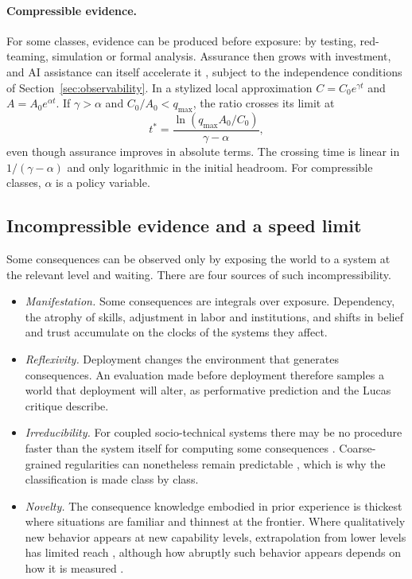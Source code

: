 \documentclass[11pt]{article}
\theoremstyle{plain}
\theoremstyle{definition}
\newcommand{\qmax}{q_{\max}}
\begin{document}
\paragraph{Compressible evidence.} For some classes, evidence can be produced before exposure: by testing, red-teaming, simulation or formal analysis. Assurance then grows with investment, and AI assistance can itself accelerate it \citep{perez2022}, subject to the independence conditions of Section~\ref{sec:observability}. In a stylized local approximation $C=C_0e^{\gamma t}$ and $A=A_0e^{\alpha t}$. If $\gamma>\alpha$ and $C_0/A_0<\qmax$, the ratio crosses its limit at
\begin{equation}\label{eq:crossing}
t^\ast=\frac{\ln(\qmax A_0/C_0)}{\gamma-\alpha},
\end{equation}
even though assurance improves in absolute terms. The crossing time is linear in $1/(\gamma-\alpha)$ and only logarithmic in the initial headroom. For compressible classes, $\alpha$ is a policy variable.

\subsection{Incompressible evidence and a speed limit}

Some consequences can be observed only by exposing the world to a system at the relevant level and waiting. There are four sources of such incompressibility.
\begin{itemize}[leftmargin=*]
\item \emph{Manifestation.} Some consequences are integrals over exposure. Dependency, the atrophy of skills, adjustment in labor and institutions, and shifts in belief and trust accumulate on the clocks of the systems they affect.
\item \emph{Reflexivity.} Deployment changes the environment that generates consequences. An evaluation made before deployment therefore samples a world that deployment will alter, as performative prediction \citep{perdomo2020} and the Lucas critique \citep{lucas1976} describe.
\item \emph{Irreducibility.} For coupled socio-technical systems there may be no procedure faster than the system itself for computing some consequences \citep{moore1990}. Coarse-grained regularities can nonetheless remain predictable \citep{israeli2004}, which is why the classification is made class by class.
\item \emph{Novelty.} The consequence knowledge embodied in prior experience is thickest where situations are familiar and thinnest at the frontier. Where qualitatively new behavior appears at new capability levels, extrapolation from lower levels has limited reach \citep{wei2022}, although how abruptly such behavior appears depends on how it is measured \citep{schaeffer2023}.
\end{itemize}
\end{document}
